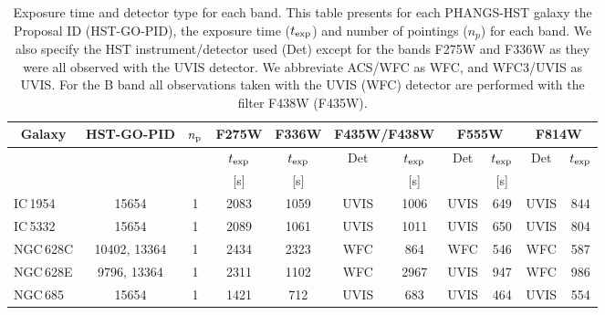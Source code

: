 %
\begin{table*}
\begin{center}
\caption{Exposure time and detector type for each band. This table presents for each PHANGS-HST galaxy the Proposal ID (HST-GO-PID), the exposure time ($t_{\rm exp}$) and number of pointings ($n_{p}$) for each band. We also specify the HST instrument/detector used (Det) except for the bands F275W and F336W as they were all observed with the UVIS detector. We abbreviate ACS/WFC as WFC, and WFC3/UVIS as UVIS. For the B band all observations taken with the UVIS (WFC) detector are performed with the filter F438W (F435W). %
}  
\label{tab:exp_time}
\begin{tabular}{lcccccccccc}
\multicolumn{1}{c}{Galaxy} & \multicolumn{1}{c}{HST-GO-PID} & \multicolumn{1}{c}{${n_{\rm p}}$} & \multicolumn{1}{c}{F275W} & \multicolumn{1}{c}{F336W} & \multicolumn{2}{c}{F435W/F438W} & \multicolumn{2}{c}{F555W} & \multicolumn{2}{c}{F814W} \\ 
\hline
\multicolumn{1}{c}{} & \multicolumn{1}{c}{} & \multicolumn{1}{c}{} & \multicolumn{1}{c}{${t_{\rm exp}}$} & \multicolumn{1}{c}{${t_{\rm exp}}$} & \multicolumn{1}{c}{Det} & \multicolumn{1}{c}{${t_{\rm exp}}$} & \multicolumn{1}{c}{Det} & \multicolumn{1}{c}{${t_{\rm exp}}$} & \multicolumn{1}{c}{Det} & \multicolumn{1}{c}{${t_{\rm exp}}$} \\ 
\hline
\multicolumn{1}{c}{} & \multicolumn{1}{c}{} & \multicolumn{1}{c}{} & \multicolumn{1}{c}{[s]} & \multicolumn{1}{c}{[s]} & \multicolumn{1}{c}{} & \multicolumn{1}{c}{[s]} & \multicolumn{1}{c}{} & \multicolumn{1}{c}{[s]} \\ 
\hline
IC\,1954 & 15654 & 1 & 2083 & 1059 & UVIS & 1006 & UVIS & 649 & UVIS & 844\\
IC\,5332 & 15654 & 1 & 2089 & 1061 & UVIS & 1011 & UVIS & 650 & UVIS & 804\\
NGC\,628C & 10402, 13364 & 1 & 2434 & 2323 & WFC & 864 & WFC & 546 & WFC & 587\\
NGC\,628E & 9796, 13364 & 1 & 2311 & 1102 & WFC & 2967 & UVIS & 947 & WFC & 986\\
NGC\,685 & 15654 & 1 & 1421 & 712 & UVIS & 683 & UVIS & 464 & UVIS & 554\\

\end{tabular}
\end{center}
\end{table*}
